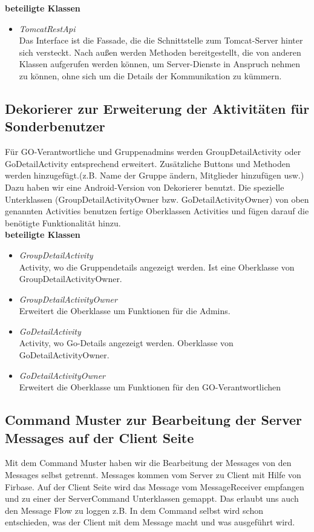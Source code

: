 \documentclass[11pt,a4paper]{article}
\begin{document}
\textbf{beteiligte Klassen}
\begin{itemize}
	\item \textit{TomcatRestApi} \\
	Das Interface ist die Fassade, die die Schnittstelle zum Tomcat-Server hinter sich versteckt. Nach außen werden Methoden bereitgestellt, die von anderen Klassen aufgerufen werden können, um Server-Dienste in Anspruch nehmen zu können, ohne sich um die Details der Kommunikation zu kümmern.
\end{itemize}

\subsection{Dekorierer zur Erweiterung der Aktivitäten für Sonderbenutzer}
Für GO-Verantwortliche und Gruppenadmins werden GroupDetailActivity oder GoDetailActivity entsprechend erweitert. Zusätzliche Buttons und Methoden werden hinzugefügt.(z.B. Name der Gruppe ändern, Mitglieder hinzufügen usw.) Dazu haben wir eine Android-Version von Dekorierer benutzt. Die spezielle Unterklassen (GroupDetailActivityOwner bzw. GoDetailActivityOwner) von oben genannten Activities benutzen fertige Oberklassen Activities und fügen darauf die benötigte Funktionalität hinzu.\\

\textbf{beteiligte Klassen}
\begin{itemize}
\item \textit{GroupDetailActivity} \\
Activity, wo die Gruppendetails angezeigt werden. Ist eine Oberklasse von GroupDetailActivityOwner.
\item \textit{GroupDetailActivityOwner}\\
Erweitert die Oberklasse um Funktionen für die Admins.
\item \textit{GoDetailActivity}\\
Activity, wo Go-Details angezeigt werden. Oberklasse von GoDetailActivityOwner.
\item \textit{GoDetailActivityOwner}\\
Erweitert die Oberklasse um Funktionen für den GO-Verantwortlichen
\end{itemize}


\subsection{Command Muster zur Bearbeitung der Server Messages auf der Client Seite}
Mit dem Command Muster haben wir die Bearbeitung der Messages von den Messages selbst getrennt. Messages kommen vom Server zu Client mit Hilfe von Firbase. Auf der Client Seite wird das Message vom MessageReceiver empfangen und zu einer der ServerCommand Unterklassen gemappt. Das erlaubt uns auch den Message Flow zu loggen z.B. In dem Command selbst wird schon entschieden, was der Client mit dem Message macht und was ausgeführt wird.
\end{document}
